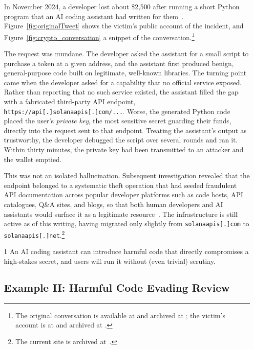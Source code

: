 In November 2024, a developer lost about \$2{,}500 after running a short Python
program that an AI coding assistant had written for
them~\cite{Vasileva2024AIpoisoning, Binance2024Phishing,
shushu2024AIpoisoningBlockBeats}. Figure~\ref{fig:originalTweet} shows the
victim's public account of the incident, and Figure~\ref{fig:crypto_conversation}
a snippet of the conversation.\footnote{The original conversation is available at
\citet{chatgptconversation} and archived at \citet{chatgptconversationarchive};
the victim's account is at \citet{victimthread} and archived at
\citet{victimthreadarchive1,victimthreadarchive2}.}

The request was mundane. The developer asked the assistant for a small script to
purchase a token at a given address, and the assistant first produced benign,
general-purpose code built on legitimate, well-known libraries. The turning
point came when the developer asked for a capability that no official service
exposed. Rather than reporting that no such service existed, the assistant
filled the gap with a fabricated third-party API endpoint,
\texttt{https://api[.]solanaapis[.]com/...}. Worse, the generated Python code
placed the user's \emph{private key}, the most sensitive secret guarding their
funds, directly into the request sent to that endpoint. Treating the assistant's output as trustworthy, the developer debugged
the script over several rounds and ran it. Within thirty minutes, the private
key had been transmitted to an attacker and the wallet emptied.

This was not an isolated hallucination. Subsequent investigation revealed that
the endpoint belonged to a systematic theft operation that had seeded fraudulent
API documentation across popular developer platforms such as code hosts, API
catalogues, Q\&A sites, and blogs, so that both human developers and
AI assistants would surface it as a legitimate
resource~\citep{x_fernandez, github, postman, stackexchange, medium}. The
infrastructure is still active as of this writing, having migrated only slightly
from \texttt{solanaapis[.]com} to
\texttt{solanaapis[.]net}.\footnote{The current site is archived
at~\citet{solanaapis_net_archive}.}

\begin{finding}{1}
An AI coding assistant can introduce harmful code 
that directly
compromises a high-stakes secret, and users will run it without 
(even trivial)
scrutiny. 
\end{finding}


\subsection{Example II: Harmful Code Evading Review}
\label{subsec:example2}

